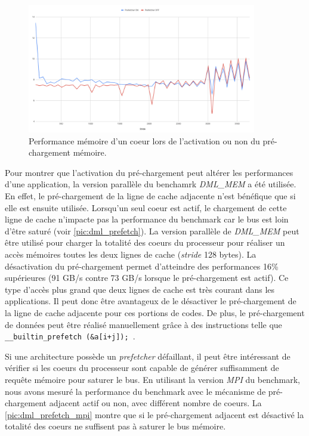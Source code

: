         \begin{figure}
        \center
        \includegraphics[width=10cm]{images/dml_prefetch.png}
        \caption{\label{pic:dml_prefetch} Performance mémoire d'un coeur lors de l'activation ou non du pré-chargement mémoire. }
        \end{figure}
         
        Pour montrer que l'activation du pré-chargement peut altérer les performances d'une application, la version parallèle du benchamrk \textit{DML\_MEM} a été utilisée. En effet, le pré-chargement de la ligne de cache adjacente n'est bénéfique que si elle est ensuite utilisée. Lorsqu'un seul coeur est actif, le chargement de cette ligne de cache n'impacte pas la performance du benchmark car le bus est loin d'être saturé (voir \autoref{pic:dml_prefetch}). La version parallèle de \textit{DML\_MEM} peut être utilisé pour charger la totalité des coeurs du processeur pour réaliser un accès mémoires toutes les deux lignes de cache (\textit{stride} 128 bytes). La désactivation du pré-chargement permet d'atteindre des performances 16\% supérieures (91 GB/s contre 73 GB/s lorsque le pré-chargement est actif). Ce type d'accès plus grand que deux lignes de cache est très courant dans les applications. Il peut donc être avantageux de le désactiver le pré-chargement de la ligne de cache adjacente pour ces portions de codes. De plus, le pré-chargement de données peut être réalisé manuellement grâce à des instructions telle que \verb| __builtin_prefetch (&a[i+j]); |.

        Si une architecture possède un \textit{prefetcher} défaillant, il peut être intéressant de vérifier si les coeurs du processeur sont capable de générer suffisamment de requête mémoire pour saturer le bus. En utilisant la version \textit{MPI} du benchmark, nous avons mesuré la performance du benchmark avec le mécanisme de pré-chargement adjacent actif ou non, avec différent nombre de coeurs. La \autoref{pic:dml_prefetch_mpi} montre que si le pré-chargement adjacent est désactivé la totalité des coeurs ne suffisent pas à saturer le bus mémoire. 
        
